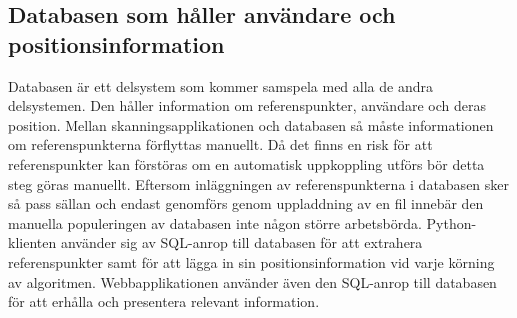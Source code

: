 \documentclass[a4paper,12pt]{article}
\begin{document}
 \subsection{Databasen som håller användare och positionsinformation}
 Databasen är ett delsystem som kommer samspela med alla de andra delsystemen. Den håller information om referenspunkter, användare och deras position.
 Mellan skanningsapplikationen och databasen så måste informationen om referenspunkterna förflyttas manuellt. Då det finns en risk för att referenspunkter kan förstöras om en automatisk uppkoppling utförs bör detta steg göras manuellt. Eftersom inläggningen av referenspunkterna i databasen sker så pass sällan och endast genomförs genom uppladdning av en fil innebär den manuella populeringen av databasen inte någon större arbetsbörda. Python-klienten använder sig av SQL-anrop till databasen för att extrahera referenspunkter samt för att lägga in sin positionsinformation vid varje körning av algoritmen. Webbapplikationen använder även den SQL-anrop till databasen för att erhålla och presentera relevant information.
\end{document}
